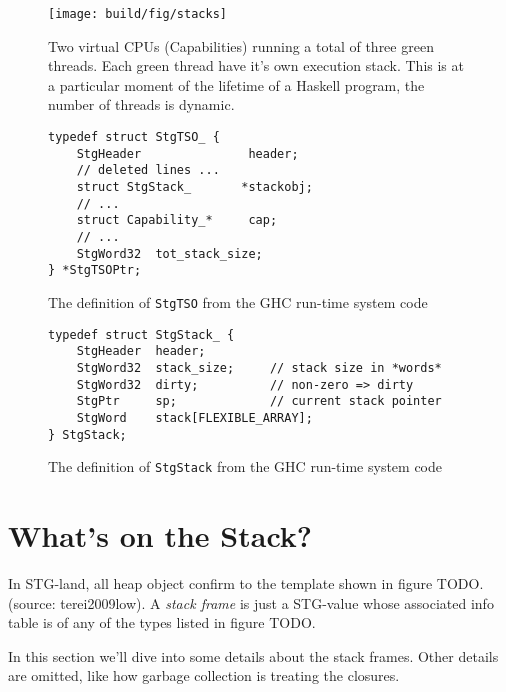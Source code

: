 \begin{figure}
  \centering
  \texttt{[image: build/fig/stacks]}
  \caption{Two virtual CPUs (Capabilities) running a total of three
green threads. Each green thread have it's own execution stack.
This is at a particular moment of the lifetime of a Haskell program,
the number of threads is dynamic.} %
  \label{fig:stacks}
\end{figure}

\begin{figure}
\begin{mdframed}
  \begin{verbatim}
typedef struct StgTSO_ {
    StgHeader               header;
    // deleted lines ...
    struct StgStack_       *stackobj;
    // ...
    struct Capability_*     cap;
    // ...
    StgWord32  tot_stack_size;
} *StgTSOPtr;
  \end{verbatim}
  \caption{The definition of \texttt{StgTSO} from the GHC run-time system
code}
  \label{fig:tso_definition}
\end{mdframed}
\end{figure}

\begin{figure}
\begin{mdframed}
  \begin{verbatim}
typedef struct StgStack_ {
    StgHeader  header;
    StgWord32  stack_size;     // stack size in *words*
    StgWord32  dirty;          // non-zero => dirty
    StgPtr     sp;             // current stack pointer
    StgWord    stack[FLEXIBLE_ARRAY];
} StgStack;
  \end{verbatim}
  \caption{The definition of \texttt{StgStack} from the GHC run-time system
code}
  \label{fig:stack_definition}
\end{mdframed}
\end{figure}

\section{What's on the Stack?}

In STG-land, all heap object confirm to the template shown in figure TODO.
(source: terei2009low). A \emph{stack frame} is just a STG-value whose
associated info table is of any of the types listed in figure TODO. %

In this section we'll dive into
some details about the stack frames. Other details
are omitted, like how garbage collection is treating the closures.

